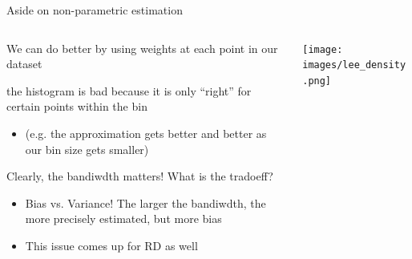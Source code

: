 \documentclass[notes,11pt, aspectratio=169]{beamer}
\newenvironment{wideitemize}{\itemize\addtolength{\itemsep}{10pt}}{\enditemize}
\begin{document}
\begin{frame}{Aside on non-parametric estimation}
  \begin{columns}[onlytextwidth, T] %
    \begin{column}{.6\textwidth}
      \begin{wideitemize}
      \item   We can do better by using weights at each point in our dataset
      \item the histogram is bad because it is only ``right'' for certain
        points within the bin
        \begin{itemize}
        \item     (e.g. the approximation gets better and better as our bin size gets smaller)
        \end{itemize}
      \item   Clearly, the bandiwdth matters! What is the tradoeff?
        \begin{itemize}
        \item Bias vs. Variance! The larger the bandiwdth, the more
          precisely estimated, but more bias
        \item This issue comes up for RD as well
        \end{itemize}
      \end{wideitemize}
    \end{column}%
    \hfill%
    \begin{column}{.4\textwidth}
      \texttt{[image: images/lee\_density.png]}
    \end{column}%
  \end{columns}
\end{frame}
\end{document}
